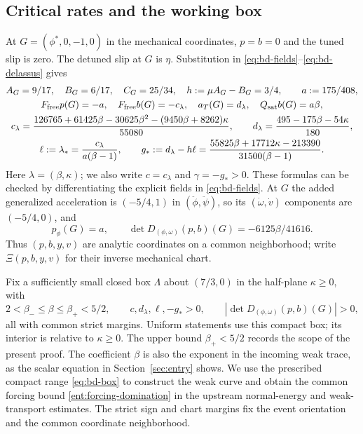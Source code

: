 \subsection{Critical rates and the working box}
At $G=(\phi^*,0,-1,0)$ in the mechanical coordinates,
$p=b=0$ and the tuned slip is zero. The detuned slip at $G$ is
$\eta$. Substitution in \eqref{eq:bd-fields}--\eqref{eq:bd-delassus}
gives
\begin{gather}
 A_G=9/17,\quad B_G=6/17,\quad C_G=25/34,\quad
 h:=\mu A_G-B_G=3/4,\qquad a:=175/408,
 \nonumber\\
 F_{\rm free}p(G)=-a,\quad F_{\rm free}b(G)=-c_\lambda,
 \quad a_T(G)=d_\lambda,\quad Q_{\rm sat}b(G)=a\beta,
 \label{eq:bd-critical-rates}\\
 c_\lambda=\frac{126765+61425\beta-30625\beta^2
                    -(9450\beta+8262)\kappa}{55080},\qquad
 d_\lambda=\frac{495-175\beta-54\kappa}{180},
 \nonumber\\
 \ell:=\lambda_*=\frac{c_\lambda}{a(\beta-1)},\qquad
 g_*:=d_\lambda-h\ell
       =\frac{55825\beta+17712\kappa-213390}{31500(\beta-1)}.
 \label{eq:bd-incoming-rates}
\end{gather}
Here $\lambda=(\beta,\kappa)$; we also write $c=c_\lambda$
and $\gamma=-g_*>0$. These formulas can be checked by differentiating the
explicit fields in \eqref{eq:bd-fields}. At $G$ the added generalized
acceleration is $(-5/4,1)$ in $(\ddot\phi,\ddot\psi)$, so its
$(\dot\omega,\dot v)$ components are $(-5/4,0)$, and
\begin{equation}
 p_\phi(G)=a,\qquad
 \det D_{(\phi,\omega)}(p,b)(G)=-6125\beta/41616.
 \label{eq:bd-chart-determinant}
\end{equation}
Thus $(p,b,y,v)$ are analytic coordinates on a common neighborhood;
write $\Xi(p,b,y,v)$ for their inverse mechanical chart.

Fix a sufficiently small closed box $\Lambda$ about $(7/3,0)$ in
the half-plane $\kappa\ge0$, with
\begin{equation}
 2<\beta_-\le\beta\le\beta_+<5/2,
 \qquad c,d_\lambda,\ell,-g_*>0,
 \qquad |\det D_{(\phi,\omega)}(p,b)(G)|>0,
 \label{eq:bd-box}
\end{equation}
all with common strict margins. Uniform statements use this compact
box; its interior is relative to $\kappa\ge0$.
The upper bound $\beta_+<5/2$ records the scope of the present proof.
The coefficient $\beta$ is also the exponent in the incoming weak
trace, as the scalar equation in Section~\ref{sec:entry}
shows. We use the prescribed compact range \eqref{eq:bd-box} to
construct the weak curve and obtain the common forcing bound
\eqref{ent:forcing-domination} in the upstream normal-energy and
weak-transport estimates. The strict sign and chart margins fix the
event orientation and the common coordinate neighborhood.

